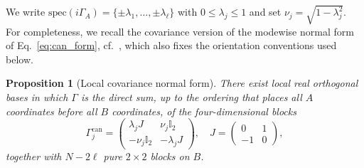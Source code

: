 \documentclass[prx,twocolumn,superscriptaddress,aps,10pt, frontmatterverbose, reprint,footinbib,longbibliography=true]{revtex4-2}
\newtheorem{proposition}{Proposition}
\begin{document}
 We write $\mathrm{spec}(i\Gamma_A)=\{\pm\lambda_1,\dots,\pm\lambda_\ell\}$ with $0\le\lambda_j\le 1$ and set $\nu_j=\sqrt{1-\lambda_j^2}$.
For completeness, we recall the covariance version of the modewise normal form of Eq.~\eqref{eq:can_form}, cf.~\cite{BoteroReznik2004}, which also fixes the orientation conventions used below. 

\begin{proposition}[Local covariance normal form]
\label{prop:covariance-normal-form}
There exist local real orthogonal bases in which $\Gamma$ is the direct sum, up to the ordering that places all $A$ coordinates before all $B$ coordinates, of the four-dimensional blocks
\begin{equation}
    \Gamma^{\mathrm{can}}_j=\begin{pmatrix}\lambda_jJ& \nu_j\mathbb{I}_2\\ -\nu_j\mathbb{I}_2&-\lambda_jJ\end{pmatrix},
    \quad J=\begin{pmatrix}0&1\\-1&0\end{pmatrix},
    \label{eq:canonical-covariance-block}
\end{equation}
together with $N-2\ell$ pure $2\times 2$ blocks on $B$.
\end{proposition}
\end{document}

